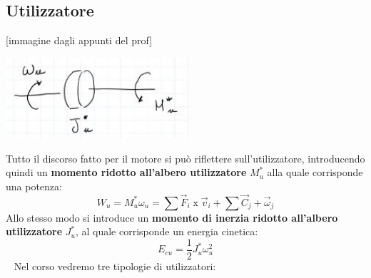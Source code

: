 \subsection{Utilizzatore}
[immagine dagli appunti del prof]
\begin{center}
    \includegraphics[height=3cm]{../lezione12/img9.JPG}
\end{center}
Tutto il discorso fatto per il motore si può riflettere sull'utilizzatore, introducendo quindi un \textbf{momento ridotto all'albero utilizzatore} $M_u^*$ alla quale corrisponde una potenza:
\[
    W_u = M_u^* \omega_u = \sum \vec{F}_i \;\text{x}\; \vec{v}_i + \sum \vec{C}_j + \vec{\omega}_j
\]
Allo stesso modo si introduce un \textbf{momento di inerzia ridotto all'albero utilizzatore} $J_u^*$, al quale corrisponde un energia cinetica:
\[
    E_{cu} = \frac{1}{2} J_u^* \omega_u^2
\]
\ \newline
Nel corso vedremo tre tipologie di utilizzatori:
